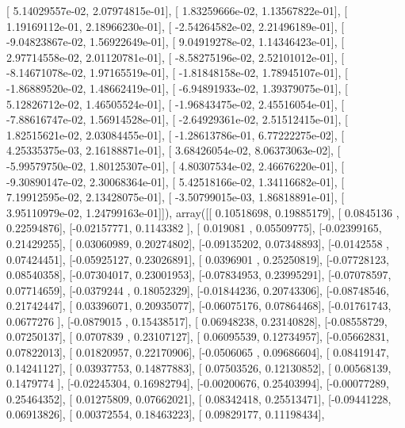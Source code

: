 \documentclass{article}
\begin{document}
       [  5.14029557e-02,   2.07974815e-01],
       [  1.83259666e-02,   1.13567822e-01],
       [  1.19169112e-01,   2.18966230e-01],
       [ -2.54264582e-02,   2.21496189e-01],
       [ -9.04823867e-02,   1.56922649e-01],
       [  9.04919278e-02,   1.14346423e-01],
       [  2.97714558e-02,   2.01120781e-01],
       [ -8.58275196e-02,   2.52101012e-01],
       [ -8.14671078e-02,   1.97165519e-01],
       [ -1.81848158e-02,   1.78945107e-01],
       [ -1.86889520e-02,   1.48662419e-01],
       [ -6.94891933e-02,   1.39379075e-01],
       [  5.12826712e-02,   1.46505524e-01],
       [ -1.96843475e-02,   2.45516054e-01],
       [ -7.88616747e-02,   1.56914528e-01],
       [ -2.64929361e-02,   2.51512415e-01],
       [  1.82515621e-02,   2.03084455e-01],
       [ -1.28613786e-01,   6.77222275e-02],
       [  4.25335375e-03,   2.16188871e-01],
       [  3.68426054e-02,   8.06373063e-02],
       [ -5.99579750e-02,   1.80125307e-01],
       [  4.80307534e-02,   2.46676220e-01],
       [ -9.30890147e-02,   2.30068364e-01],
       [  5.42518166e-02,   1.34116682e-01],
       [  7.19912595e-02,   2.13428075e-01],
       [ -3.50799015e-03,   1.86818891e-01],
       [  3.95110979e-02,   1.24799163e-01]]), array([[ 0.10518698,  0.19885179],
       [ 0.0845136 ,  0.22594876],
       [-0.02157771,  0.1143382 ],
       [ 0.019081  ,  0.05509775],
       [-0.02399165,  0.21429255],
       [ 0.03060989,  0.20274802],
       [-0.09135202,  0.07348893],
       [-0.0142558 ,  0.07424451],
       [-0.05925127,  0.23026891],
       [ 0.0396901 ,  0.25250819],
       [-0.07728123,  0.08540358],
       [-0.07304017,  0.23001953],
       [-0.07834953,  0.23995291],
       [-0.07078597,  0.07714659],
       [-0.0379244 ,  0.18052329],
       [-0.01844236,  0.20743306],
       [-0.08748546,  0.21742447],
       [ 0.03396071,  0.20935077],
       [-0.06075176,  0.07864468],
       [-0.01761743,  0.0677276 ],
       [-0.0879015 ,  0.15438517],
       [ 0.06948238,  0.23140828],
       [-0.08558729,  0.07250137],
       [ 0.0707839 ,  0.23107127],
       [ 0.06095539,  0.12734957],
       [-0.05662831,  0.07822013],
       [ 0.01820957,  0.22170906],
       [-0.0506065 ,  0.09686604],
       [ 0.08419147,  0.14241127],
       [ 0.03937753,  0.14877883],
       [ 0.07503526,  0.12130852],
       [ 0.00568139,  0.1479774 ],
       [-0.02245304,  0.16982794],
       [-0.00200676,  0.25403994],
       [-0.00077289,  0.25464352],
       [ 0.01275809,  0.07662021],
       [ 0.08342418,  0.25513471],
       [-0.09441228,  0.06913826],
       [ 0.00372554,  0.18463223],
       [ 0.09829177,  0.11198434],
\end{document}
